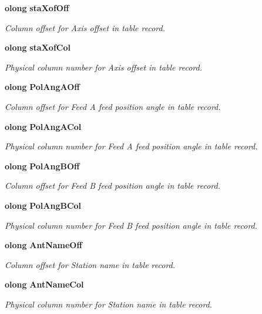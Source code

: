 \begin{CompactItemize}
{\bf olong} {\bf sta\-Xof\-Off}
\begin{CompactList}\small\item\em Column offset for Axis offset in table record. \item\end{CompactList}\item 
{\bf olong} {\bf sta\-Xof\-Col}
\begin{CompactList}\small\item\em Physical column number for Axis offset in table record. \item\end{CompactList}\item 
{\bf olong} {\bf Pol\-Ang\-AOff}
\begin{CompactList}\small\item\em Column offset for Feed A feed position angle in table record. \item\end{CompactList}\item 
{\bf olong} {\bf Pol\-Ang\-ACol}
\begin{CompactList}\small\item\em Physical column number for Feed A feed position angle in table record. \item\end{CompactList}\item 
{\bf olong} {\bf Pol\-Ang\-BOff}
\begin{CompactList}\small\item\em Column offset for Feed B feed position angle in table record. \item\end{CompactList}\item 
{\bf olong} {\bf Pol\-Ang\-BCol}
\begin{CompactList}\small\item\em Physical column number for Feed B feed position angle in table record. \item\end{CompactList}\item 
{\bf olong} {\bf Ant\-Name\-Off}
\begin{CompactList}\small\item\em Column offset for Station name in table record. \item\end{CompactList}\item 
{\bf olong} {\bf Ant\-Name\-Col}
\begin{CompactList}\small\item\em Physical column number for Station name in table record. \item\end{CompactList}\item 

\end{CompactItemize}
